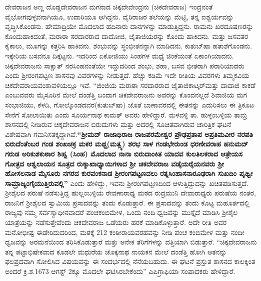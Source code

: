 ದೇವರಾಜನ ಅಣ್ಣ ದೊಡ್ಡದೇವರಾಜನ ಮಗನಾದ ಚಿಕ್ಕದೇವೇಂದ್ರನು (ಚಿಕದೇವರಾಜ) ಇಂದ್ರನಂತೆ ವೈಭೋಗ\-ವುಳ್ಳವನಾಗಿಯೂ, ಉದಾರಿಯೂ ಆಗಿದ್ದನು. ವೈರಿರಾಜರ ತಲೆಯನ್ನು ಮೆಟ್ಟಿ, ತನ್ನ ಐಶ್ವರ್ಯವನ್ನು ವೃದ್ಧಿಸಿಕೊಂಡನು. ಹೇಮಾದ್ರಿಯೇ ಮೊದಲಾದ ಹದಿನಾರು ದಾನಗಳನ್ನು ಮಾಡುತ್ತಿದ್ದನು. ರಾಮನು ಖರದೂಷಣರನ್ನು ಕೊಂದುಹಾಕಿದಂತೆ, ಮರಾಠಾ ಸರದಾರರಾದ ದಾದೋಜಿ, ಜೈತಾಜಿಯರನ್ನು ಕೊಂದು ಹಾಕಿದನು. ಮತ್ತು ಜಸವತರ ಕೈಕಾಲು, ಮೂಗನ್ನು ಕತ್ತರಿಸಿ ಹಾಕಿದನು. ಶಂಭುವನ್ನು ಸ್ಥಂಭೀತನನ್ನಾಗಿ ಮಾಡಿದನು. ಕುತುಬ್​ಷಾ ಹತಾಶೆಗೊಂಡನು. ಇಕ್ಕೇರಿಯ ಬಸವನೂ ದಿಕ್ಕೆಟ್ಟನು. ಇದರಿಂದ ಏಕೋಜಿಯು ಸಿಂಹಗಳ ಮಧ್ಯೆ ಜಿಂಕೆಯಂತೆ ಏಕಾಂಗಿಯಾದನು. ಚಿಕ್ಕದೇವರಾಜನು ಸಾಕ್ಷಾತ್​ ನರಸಿಂಹನಂತೆಯೇ ಇದ್ದುದರಿಂದ ಶಂಭು, ಶಹಾ, ಬಸವ ಭೀತರಾಗಿ ಪರಾರಿಯಾದರು ಎಂದು ಶ‍್ರೀರಂಗಪಟ್ಟಣ ಶಾಸನವು ವಿವರಗಳನ್ನು ನೀಡುತ್ತದೆ. ಹೆಚ್ಚು ಕಡಿಮೆ ಇದೇ ರೀತಿಯ ವಿವರಗಳು ತಿಮ್ಮಕವಿಯ ಚಿಕದೇವರಾಯವಂಶಾವಳಿಯಲ್ಲೂ ಇವೆ. “ಜಿಂಜಿಯ ಮರಾಠಾ ಸರದಾರರಾದ ಜೈತಾಜಿಕಾಟ್ಕರ್​ ಮತ್ತು ದಾದಾಜಿ ಕಾಕಡೆ ಎಂಬುವವರು ಮೈಸೂರಿನ ಮೇಲೆ ದಂಡೆತ್ತಿ ಬಂದಾಗ ಚಿಕದೇವರಾಜನು ಅವರನ್ನು ಕೊಂದನಲ್ಲದೆ ಶಿವಾಜಿಯ ಮಗ ಸಂಭಾಜಿಯು, ಕೆಳದಿ, ಗೋಲ್ಕೊಂಡದವರ\break (ಕುತುಬ್​ಷಾ) ಜೊತೆ ಬಾಣಾವರದಲ್ಲಿ ಈತನನ್ನು ಎದುರಿಸಲು ಈ ತ್ರಿಕೂಟ ಸೇನೆಗೆ ಸೋಲಾಯಿತು ಎಂದು ಸೂರ್ಯನಾಥ ಕಾಮತ್​ ಅವರು ಹೇಳಿದ್ದಾರೆ. ಮಳವಳ್ಳಿ ತಾ. ಹುಳ್ಳಂಬಳ್ಳಿಯ ತಾಮ್ರ ಶಾಸನದಲ್ಲಿ ನೀಡಿರುವ ಚಿಕ್ಕದೇವರಾಜನ ಬಿರುದುಗಳು ಮತ್ತು ಅದರಲ್ಲಿ ಸೂಚಿತವಾಗಿರುವ ಚಾರಿತ್ರಿಕ ಘಟನೆ ವಿಶೇಷವಾಗಿ ಗಮನಿಸತಕ್ಕದ್ದಾಗಿವೆ.\textbf{“ಶ‍್ರೀಮದ್​ ರಾಜಾಧಿರಾಜ ರಾಜಪರಮೇಶ್ವರ ಪ್ರೌಢಪ್ರತಾಪ ಅಪ್ರತಿಮವೀರ ನರಪತಿ ಬಿರುದೆಂತೆಂಬರ ಗಂಡ ಶಂಖಚಕ್ರ ಮಕರ ಮಥ್ಚ(ಮತ್ಸ್ಯ) ಶರಭ ಸಾಳ ಗಂಡಭೇರುಂಡ ಧರಣೀವರಾಹ ಹನುಮದ್​ಗರುಡ ಅರಿಕುಶಕುಠಾರ ಶಿಹ್ವ (ಸಿಂಹ) ಮೊದಲಾದ ನಾನಾ ಬಿರುದಾಂಕಿತ ಯಾದವ ಕುಲತಿಲಕರಾದ ಆತ್ರೇಯಸ ಗೋತ್ರದ ಆಶ್ವಲಾಯನ ಸೂತ್ರದ ರುಕ್ಶಾಖಾಧ್ಯಾಯಿಗಳಾದ ಶ‍್ರೀ ಚಿಕದೇವರಾಜ ವಡೈಯರೈಯನವರು ಶ‍್ರೀ ಹೋಸಲನಾಡ ಮೈಸೂರು ನಗರದ ಕುರವಂಕನಾಡ ಶ‍್ರೀರಂಗಪಟ್ಟಣದಲು ರತ್ನಸಿಂಹಾಸನಾರೂಢರಾಗಿ ಸುಖದಿಂ ಪೃಥ್ವೀ ಸಾಮ್ರಾಜ್ಯಂಗೈಯುತ್ತಿರುವಲ್ಲಿ”} ಎಂದು ಹೇಳಿದ್ದು, ಇವನು ಶ‍್ರೀರಂಗಪಟ್ಟಣದಿಂದ ಆಳುತ್ತಿದ್ದುದನ್ನು ಖಚಿತಪಡಿಸುತ್ತದೆ. ಶ‍್ರೀಶೈಲದ ಪರುಷೆ ನಡೆಸುತ್ತಿದ್ದ ಹುಲ್ಲಂಬಳ್ಳಿಯ ರೇವಣಾರಾಧ್ಯ ಮಠದ ರುದ್ರಮುನಿ ದೇವಾರಾಧ್ಯರು ಪರುಷೆಯ ನಂತರ, ರಾಜನಿಗೆ ಶ‍್ರೀಶೈಲದ ಸ್ವಾಮಿಯ ಪ್ರಸಾದವನ್ನು ತಂದು ಕೊಡುತ್ತಾರೆ. ಈ ಪ್ರಸಾದವನ್ನು ತಂದು ಕೊಟ್ಟ ಮಹೂರ್ತದಲ್ಲಿ ರಾಜ್ಯವು ನಮ್ಮ ಸರ್ವಸ್ವಾಧೀನವಾದರೆ ಪಂಚಕಂಬಿಮೇಳ, ಒಂದು ನಂದಿ ಧ್ವಜವನ್ನು ಮುಸ್ತೈದೆ ಮಾಡಿಸಿ ಶ‍್ರೀಶೈಲ ಯಾತ್ರೆಯನ್ನು ನಡೆಸುತ್ತೇವೆಂದು ಚಿಕದೇವರಾಜ ಒಡೆಯರು ಹರಕೆ ಮಾಡಿಕೊಳ್ಳುತ್ತಾರೆ. ಅದೇ ರೀತಿ ಅವರ ಮನೋಭೀಷ್ಟ ಈಡೇರಿದುದರಿಂದ, ಮಠಕ್ಕೆ 212 ಕಂಠೀರಾಯವರಹವನ್ನು ನೀಡಿ ಪಂಚ ಕಂಬಿಮೇಳ ಮತ್ತು ನಂದೀ ಧ್ವಜವನ್ನು ಅರಮನೆಯಿಂದ ತರಿಸಿಕೊಡುತ್ತಾರೆ ಮತ್ತು ಅನೇಕ ತೆರಿಗೆಗಳನ್ನು ದತ್ತಿಯಾಗಿ ಬಿಡುತ್ತಾರೆ. “ಚಿಕ್ಕದೇವರಾಜನು ತನ್ನ ಪಟ್ಟಾಭಿಷೇಕವಾದ ಕೂಡಲೇ ಮಧುರೆಯ ಚೊಕ್ಕನಾಥ ನಾಯಕನ ಮೇಲೆ ದಂಡೆತ್ತಿ ಹೋಗಿ ಆತನನ್ನು ಫಲಪ್ರದವಾಗಿ ಸೋಲಿಸಿದ ವಿಷಯವನ್ನು ಈ ಸಂದರ್ಭದಲ್ಲಿ ನೆನೆಯಬಹುದು. ಈ ಘಟನೆ ಪ್ರಸ್ತುತ ಶಾಸನದ ಕಾಲಕ್ಕಿಂತ ಅಂದರೆ ಕ್ರಿ.ಶ.1673 ಆಗಸ್ಟ್​ 2ಕ್ಕೂ ಮೊದಲೇ ಘಟಿಸಿರಬೇಕೆಂದು” ಎಪಿಗ್ರಾಫಿಯಾ ಸಂಪಾದಕರು ಹೇಳಿದ್ದಾರೆ.

